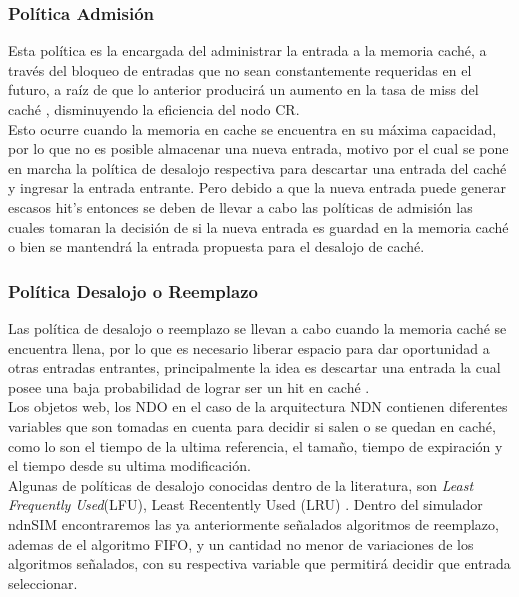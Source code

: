 \documentclass[12pt]{ociamthesis}  %
\begin{document}
\subsubsection{Política Admisión}
Esta política es la encargada del administrar la entrada a la memoria caché, a través del bloqueo de entradas que no sean constantemente requeridas en el futuro, a raíz de que lo anterior producirá un aumento en la tasa de miss del caché \cite{baeza2007admission}, disminuyendo la eficiencia del nodo CR.\\

Esto ocurre cuando la memoria en cache se encuentra en su máxima capacidad, por lo que no es posible almacenar una nueva entrada, motivo por el cual se pone en marcha la política de desalojo respectiva para descartar una entrada del caché y ingresar la entrada entrante. Pero debido a que la nueva entrada puede generar escasos hit's entonces se deben de llevar a cabo las políticas de admisión las cuales tomaran la decisión de si la nueva entrada es guardad en la memoria caché o bien se mantendrá la entrada propuesta para el desalojo de caché.\\

\subsubsection{Política Desalojo o Reemplazo}
Las política de desalojo o reemplazo se llevan a cabo cuando la memoria caché se encuentra llena, por lo que es necesario liberar espacio para dar oportunidad a otras entradas entrantes, principalmente la idea es descartar una entrada la cual posee una baja probabilidad de lograr ser un hit en caché \cite{baeza2007admission}.\\

Los objetos web, los NDO en el caso de la arquitectura NDN contienen diferentes variables que son tomadas en cuenta para decidir si salen o se quedan en caché, como lo son el tiempo de la ultima referencia, el tamaño, tiempo de expiración y el tiempo desde su ultima modificación.\\

Algunas de políticas de desalojo conocidas dentro de la literatura, son \textit{Least Frequently Used}(LFU), Least Recentently Used
(LRU) \cite{gomez2014servicios}\cite{gan2009improved}\cite{cambazoglu2010refreshing}. Dentro del simulador ndnSIM encontraremos las ya anteriormente señalados algoritmos de reemplazo, ademas de el algoritmo FIFO, y un cantidad no menor de variaciones de los algoritmos señalados, con su respectiva variable que permitirá decidir que entrada seleccionar.\\
\end{document}
